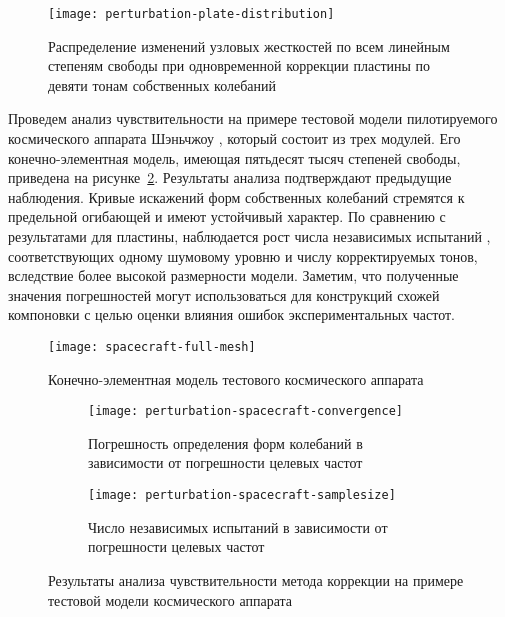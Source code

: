 \begin{figure}[!htb]
	\centering
	\texttt{[image: perturbation-plate-distribution]}
	\caption{Распределение изменений узловых жесткостей по всем линейным степеням свободы при одновременной коррекции пластины по девяти тонам собственных колебаний} \label{fig:perturbation-plate-distribution}
\end{figure}

Проведем анализ чувствительности на примере тестовой модели пилотируемого космического аппарата Шэньчжоу \cite{lib:misc:Shenzhou}, который состоит из трех модулей. Его конечно-элементная модель, имеющая пятьдесят тысяч степеней свободы, приведена на рисунке~\ref{fig:spacecraft-full-mesh}. Результаты анализа подтверждают предыдущие наблюдения. Кривые искажений форм собственных колебаний  стремятся к предельной огибающей и имеют устойчивый характер. По сравнению с результатами для пластины, наблюдается рост числа независимых испытаний , соответствующих одному шумовому уровню и числу корректируемых тонов, вследствие более высокой размерности модели. Заметим, что полученные значения погрешностей могут использоваться для конструкций схожей компоновки с целью оценки влияния ошибок экспериментальных частот.

\begin{figure}[H]
	\centering
	\texttt{[image: spacecraft-full-mesh]}
	\caption{Конечно-элементная модель тестового космического аппарата} \label{fig:spacecraft-full-mesh}
\end{figure}

\begin{figure}[!htb]
	\begin{subfigure}[b]{0.46\textwidth}
		\texttt{[image: perturbation-spacecraft-convergence]}
		\caption{Погрешность определения форм колебаний в зависимости от погрешности целевых частот} \label{fig:perturbation-spacecraft-convergence}
	\end{subfigure}
	\hfill
	\begin{subfigure}[b]{0.48\textwidth}
		\texttt{[image: perturbation-spacecraft-samplesize]}
		\caption{Число независимых испытаний в зависимости от погрешности целевых частот} \label{fig:perturbation-spacecraft-samplesize}
	\end{subfigure}
	\caption{Результаты анализа чувствительности метода коррекции на примере тестовой модели космического аппарата} \label{fig:spacecraft-plate}
\end{figure}

